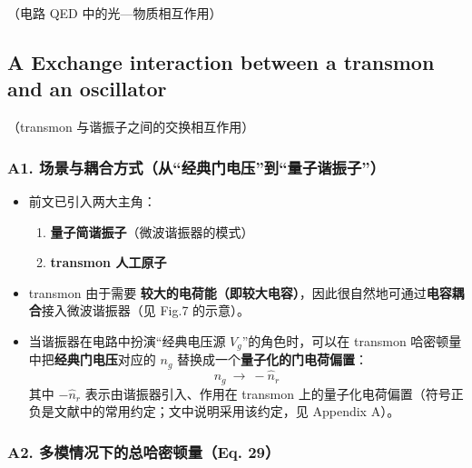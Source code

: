 \documentclass[12pt,a4paper,oneside]{ctexbook}
\providecommand{\tightlist}{%
  \setlength{\itemsep}{0pt}\setlength{\parskip}{0pt}}
\begin{document}
（电路 QED 中的光---物质相互作用）


\subsection{A Exchange interaction between a
transmon and an
oscillator}
（transmon 与谐振子之间的交换相互作用）

\subsubsection{\texorpdfstring{\textbf{A1.
场景与耦合方式（从``经典门电压''到``量子谐振子''）}}{A1. 场景与耦合方式（从``经典门电压''到``量子谐振子''）}}\label{a1.-ux573aux666fux4e0eux8026ux5408ux65b9ux5f0fux4eceux7ecfux5178ux95e8ux7535ux538bux5230ux91cfux5b50ux8c10ux632fux5b50}

\begin{itemize}
\tightlist
\item
  前文已引入两大主角：

  \begin{enumerate}
  \def\labelenumi{\arabic{enumi})}
  \tightlist
  \item
    \textbf{量子简谐振子}（微波谐振器的模式）
  \item
    \textbf{transmon 人工原子}
  \end{enumerate}
\item
  transmon 由于需要
  \textbf{较大的电荷能（即较大电容）}，因此很自然地可通过\textbf{电容耦合}接入微波谐振器（见
  Fig.7 的示意）。
\item
  当谐振器在电路中扮演``经典电压源 \(V_g\)''的角色时，可以在 transmon
  哈密顿量中把\textbf{经典门电压}对应的 \textbf{\(n_g\)}
  替换成一个\textbf{量子化的门电荷偏置}： \[
  n_g \ \rightarrow\ -\hat n_r
  \] 其中 \(-\hat n_r\) 表示由谐振器引入、作用在 transmon
  上的量子化电荷偏置（符号正负是文献中的常用约定；文中说明采用该约定，见
  Appendix A）。
\end{itemize}

\subsubsection{\texorpdfstring{\textbf{A2. 多模情况下的总哈密顿量（Eq.
29）}}{A2. 多模情况下的总哈密顿量（Eq. 29）}}\label{a2.-ux591aux6a21ux60c5ux51b5ux4e0bux7684ux603bux54c8ux5bc6ux987fux91cfeq.-29}
\end{document}

